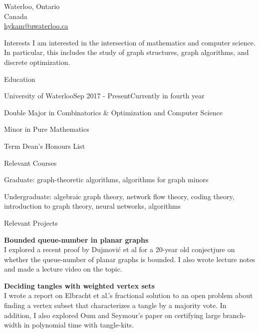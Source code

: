 \documentclass{cv}
\begin{document}

Waterloo, Ontario \\
Canada \\
\href{hykam@uwaterloo.ca}{hykam@uwaterloo.ca}

\begin{rSection}{Interests}
	I am interested in the intersection of mathematics and computer science. In particular, this includes the study of graph structures, graph algorithms, and discrete optimization.
\end{rSection}

\begin{rSection}{Education}
\begin{rSubsection}{University of Waterloo}{Sep 2017 - Present}{Currently in fourth year}{}
	\item Double Major in Combinatorics \& Optimization and Computer Science
	\item Minor in Pure Mathematics
	\item Term Dean's Honours List
\end{rSubsection}

\begin{rSubsection}{Relevant Courses}{}{}{}
	\item Graduate: graph-theoretic algorithms, algorithms for graph minors
	\item Undergraduate: algebraic graph theory, network flow theory, coding theory, introduction to graph theory, neural networks, algorithms
\end{rSubsection}

\begin{rSubsection}{Relevant Projects}{}{}{}	
	\item \textbf{Bounded queue-number in planar graphs}\\
	I explored a recent proof by Dujmovi\'{c} et al \cite{queue} for a 20-year old conjectjure on whether the queue-number of planar graphs is bounded. I also wrote lecture notes and made a lecture video on the topic.\\

	\item \textbf{Deciding tangles with weighted vertex sets}\\
	I wrote a report on Elbracht et al.'s fractional solution \cite{tangle} to an open problem about finding a vertex subset that characterizes a tangle by a majority vote. In addition, I also explored Oum and Seymour's paper \cite{branchwidth} on certifying large branch-width in polynomial time with tangle-kits. 
\end{rSubsection}
\end{rSection}
\end{document}

